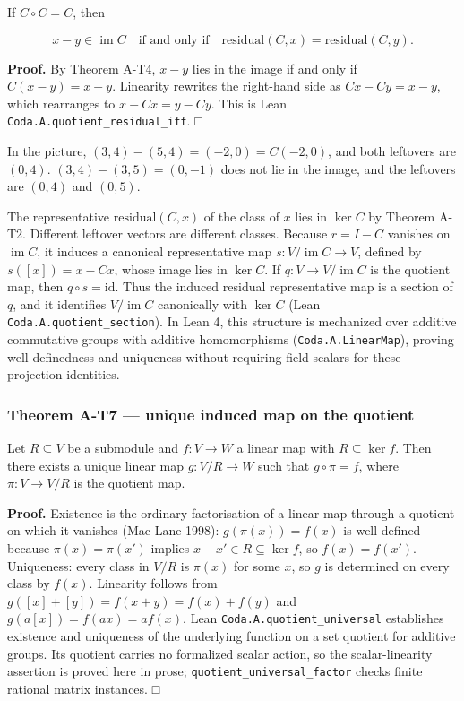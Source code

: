\documentclass[
  11pt,
]{article}
\begin{document}
If \(C\circ C=C\), then

\[
x-y\in\operatorname{im} C
\quad\text{if and only if}\quad
\mathrm{residual}(C,x)=\mathrm{residual}(C,y).
\]

\textbf{Proof.} By Theorem A-T4, \(x-y\) lies in the image if and only if \(C(x-y)=x-y\). Linearity rewrites the right-hand side as \(Cx-Cy=x-y\), which rearranges to \(x-Cx=y-Cy\). This is Lean \nolinkurl{Coda.A.quotient_residual_iff}. □

In the picture, \((3,4)-(5,4)=(-2,0)=C(-2,0)\), and both leftovers are \((0,4)\). \((3,4)-(3,5)=(0,-1)\) does not lie in the image, and the leftovers are \((0,4)\) and \((0,5)\).

The representative \(\mathrm{residual}(C,x)\) of the class of \(x\) lies in \(\ker C\) by Theorem A-T2. Different leftover vectors are different classes. Because \(r = I-C\) vanishes on \(\operatorname{im} C\), it induces a canonical representative map \(s : V / \operatorname{im} C \to V\), defined by \(s([x]) = x-Cx\), whose image lies in \(\ker C\). If \(q : V \to V / \operatorname{im} C\) is the quotient map, then \(q \circ s = \mathrm{id}\). Thus the induced residual representative map is a section of \(q\), and it identifies \(V / \operatorname{im} C\) canonically with \(\ker C\) (Lean \nolinkurl{Coda.A.quotient_section}). In Lean 4, this structure is mechanized over additive commutative groups with additive homomorphisms (\texttt{Coda.A.LinearMap}), proving well-definedness and uniqueness without requiring field scalars for these projection identities.

\subsubsection{Theorem A-T7 --- unique induced map on the quotient}\label{theorem-a-t7-unique-induced-map-on-the-quotient}

Let \(R\subseteq V\) be a submodule and \(f:V\to W\) a linear map with \(R\subseteq\ker f\). Then there exists a unique linear map \(g:V/R\to W\) such that \(g\circ\pi=f\), where \(\pi:V\to V/R\) is the quotient map.

\textbf{Proof.} Existence is the ordinary factorisation of a linear map through a quotient on which it vanishes (Mac Lane 1998): \(g(\pi(x))=f(x)\) is well-defined because \(\pi(x)=\pi(x')\) implies \(x-x'\in R\subseteq\ker f\), so \(f(x)=f(x')\). Uniqueness: every class in \(V/R\) is \(\pi(x)\) for some \(x\), so \(g\) is determined on every class by \(f(x)\). Linearity follows from \(g([x]+[y])=f(x+y)=f(x)+f(y)\) and \(g(a[x])=f(ax)=af(x)\). Lean \nolinkurl{Coda.A.quotient_universal} establishes existence and uniqueness of the underlying function on a set quotient for additive groups. Its quotient carries no formalized scalar action, so the scalar-linearity assertion is proved here in prose; \nolinkurl{quotient_universal_factor} checks finite rational matrix instances. □
\end{document}
